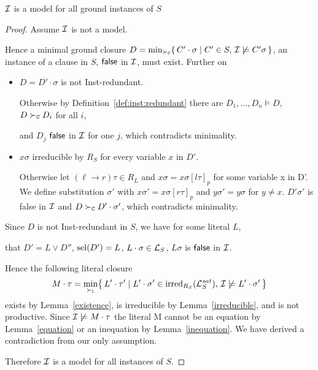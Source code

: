       \begin{lemma}\label{lemma:model:is:candidate}
           \( \mathcal{I} \) is a model for all ground instances of \( S \)
       \end{lemma}

       \begin{proof}
            Assume \( \mathcal{I} \) is not a model.

            Hence a minimal ground closure \(
                D = \min_{\mathrel\succ_{\mathtt{C}}} \{ \,
                C'\cdot\sigma \mid C'\in S, \,
               \mathcal{I}\not\models C'\sigma \,
               \} \),
                an instance of a clause in \( S \),
               \( \mathsf{false} \) in \( \mathcal{I} \), must exist. Further on

       \begin{itemize}
           \item \( D = D'\cdot\sigma \) is not Inst-redundant.
           \vspace{0.2em}

            Otherwise by Definition~\ref{def:inst:redundant} there are
           \( D_1,\ldots,D_n\models D \), \( D\mathrel\succ_{\mathtt{C}} D_i \) for all \( i \),

            and \( D_j \) \( \mathsf{false} \) in \( \mathcal{I} \) for one \( j \), which contradicts minimality.
           \hfill

           \item \( x\sigma \) irreducible by \( R_S \) for every variable \( x \) in \( D' \).
           \vspace{0.2em}

            Otherwise let \( (\ell\to r)\tau\in R_L \) and \( x\sigma = x\sigma{[l\tau]}_p \) for some variable x in D'.
            We define substitution \( \sigma' \) with \( x\sigma' = x\sigma{[r\tau]}_p \) and \( y\sigma' = y\sigma \) for \( y\neq x \).
           \( D'\sigma' \) is false in \( \mathcal{I} \) and \( D\mathrel\succ_{\mathtt{C}} D'\cdot\sigma' \),
            which contradicts minimality.\hfill
       \end{itemize}

        Since \( D \) is not Inst-redundant in \( S \),
        we have for some literal \( L \),

        that \( D' = L\lor D'' \), \( \operatorname{sel}(D') = L \), \( L\cdot\sigma\in\mathcal{L}_S \),
       \( L\sigma \) is \( \mathsf{false} \) in \( \mathcal{I} \).
       \vspace{0.7em}

        Hence the following literal closure
       \begin{gather*}
            M\cdot\tau = \min_{\mathrel\succ_{\mathtt{L}}}\!
   \left \{ \,
        L'\cdot\tau' \mid
        L'\cdot\sigma' \in \operatorname{irred}_{R_S}(\mathcal{L}_S^{sat}), \,
       \mathcal{I}\not\models L'\cdot\sigma' \,
   \right \}
       \end{gather*}
        exists by Lemma~\ref{existence}, is irreducible by Lemma~\ref{irreducible},
        and is not productive.
        Since \( \mathcal{I}\not\models M\cdot\tau \) the literal
        M cannot be an equation by Lemma~\ref{equation}
        or an inequation by Lemma~\ref{inequation}.
        We have derived a contradiction from our only assumption.

        Therefore \( \mathcal{I} \) is a model for all instances of \( S \).
   \end{proof}



